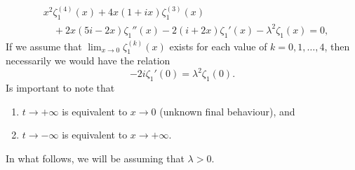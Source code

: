 \documentclass[%
 aip,
 jmp,%
 amsmath,amssymb,
 reprint,%
]{revtex4-2}
\begin{document}
\begin{equation}\label{eq:zeta_1(x)}
\boxed{\begin{aligned}
& x^2\zeta_1^{(4)}(x) + 4x(1+ ix)\zeta_1^{(3)}(x) \\
& \quad + 2x (5i-2x)\zeta_1''(x) - 2(i+2x)\zeta_1'(x) - \lambda^2\zeta_1(x)=0,
\end{aligned}}
\end{equation}
If we assume that $\lim_{x\to 0}\zeta_1^{(k)}(x)$ exists for each value of $k=0,1,\ldots, 4$, then necessarily we would have the relation
\begin{equation}\label{cond_imp}
-2i \zeta_1'(0) = \lambda^2 \zeta_1(0).
\end{equation}
Is important to note that 
\begin{enumerate}
\item[(a)]  $t\to+\infty$ is equivalent to $x\to 0$ (unknown final behaviour), and

\item[(b)]  $t\to-\infty$ is equivalent to $x\to +\infty$.%
\end{enumerate}
In what follows, we will be assuming that  $\lambda>0$. %

\end{document}
